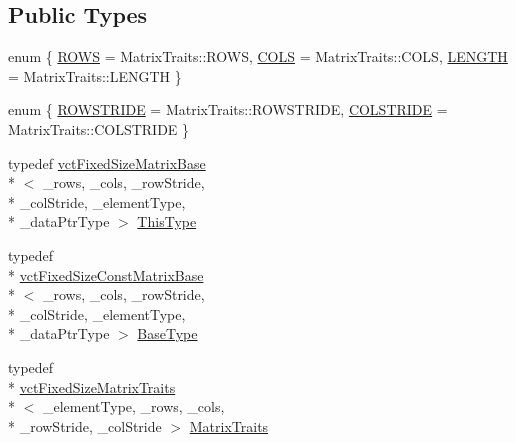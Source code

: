 \subsection*{Public Types}
\begin{DoxyCompactItemize}
\item 
enum \{ \hyperlink{classvct_fixed_size_matrix_base_a939e2f4b06ffc96c2d9d9a27dcb9fa33ab17b61dd0080412b3f116710fdfcc928}{R\-O\-W\-S} = Matrix\-Traits\-:\-:R\-O\-W\-S, 
\hyperlink{classvct_fixed_size_matrix_base_a939e2f4b06ffc96c2d9d9a27dcb9fa33a977a8d137c1cd687cca56aaea7ecf08c}{C\-O\-L\-S} = Matrix\-Traits\-:\-:C\-O\-L\-S, 
\hyperlink{classvct_fixed_size_matrix_base_a939e2f4b06ffc96c2d9d9a27dcb9fa33ac8bf7d534608f60f8196c0bf3d6a52c5}{L\-E\-N\-G\-T\-H} = Matrix\-Traits\-:\-:L\-E\-N\-G\-T\-H
 \}
\item 
enum \{ \hyperlink{classvct_fixed_size_matrix_base_a7ca4cc289d4bd697476f2d37e82e9a38a6c561939f5de9c5e815b889df7662117}{R\-O\-W\-S\-T\-R\-I\-D\-E} = Matrix\-Traits\-:\-:R\-O\-W\-S\-T\-R\-I\-D\-E, 
\hyperlink{classvct_fixed_size_matrix_base_a7ca4cc289d4bd697476f2d37e82e9a38a920a67cbcd917bab0e46677bf43cb6b8}{C\-O\-L\-S\-T\-R\-I\-D\-E} = Matrix\-Traits\-:\-:C\-O\-L\-S\-T\-R\-I\-D\-E
 \}
\item 
typedef \hyperlink{classvct_fixed_size_matrix_base}{vct\-Fixed\-Size\-Matrix\-Base}\\*
$<$ \-\_\-rows, \-\_\-cols, \-\_\-row\-Stride, \\*
\-\_\-col\-Stride, \-\_\-element\-Type, \\*
\-\_\-data\-Ptr\-Type $>$ \hyperlink{classvct_fixed_size_matrix_base_ad2d0e739023eaf4fe1a77106083eec76}{This\-Type}
\item 
typedef \\*
\hyperlink{classvct_fixed_size_const_matrix_base}{vct\-Fixed\-Size\-Const\-Matrix\-Base}\\*
$<$ \-\_\-rows, \-\_\-cols, \-\_\-row\-Stride, \\*
\-\_\-col\-Stride, \-\_\-element\-Type, \\*
\-\_\-data\-Ptr\-Type $>$ \hyperlink{classvct_fixed_size_matrix_base_af750de762d865940c9eba155b2e87b9c}{Base\-Type}
\item 
typedef \\*
\hyperlink{classvct_fixed_size_matrix_traits}{vct\-Fixed\-Size\-Matrix\-Traits}\\*
$<$ \-\_\-element\-Type, \-\_\-rows, \-\_\-cols, \\*
\-\_\-row\-Stride, \-\_\-col\-Stride $>$ \hyperlink{classvct_fixed_size_matrix_base_a6691e8d4aab2e2d733c494357ffd870a}{Matrix\-Traits}

\end{DoxyCompactItemize}
